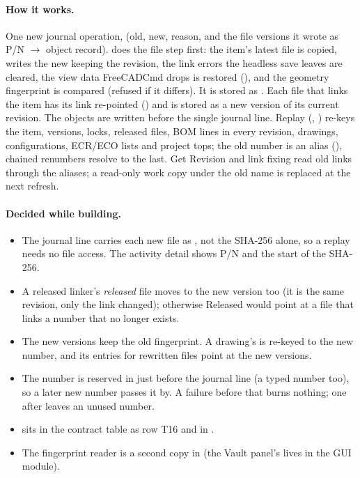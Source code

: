 \paragraph{How it works.} One new journal operation,  (old, new, reason, and the file versions it
wrote as P/N $\to$ object record).  does the file step first: the item's latest file is
copied,  writes the new  keeping the revision, the link errors the
headless save leaves are cleared, the view data FreeCADCmd drops is restored
(), and the geometry fingerprint is compared (refused if it differs).
It is stored as . Each file that links the item has its link re-pointed
() and is stored as a new version of its current revision. The objects are written before the
single journal line. Replay (, ) re-keys the item, versions, locks,
released files, BOM lines in every revision, drawings, configurations, ECR/ECO lists and project tops; the old
number is an alias (), chained renumbers resolve to the last. Get Revision and link fixing read
old links through the aliases; a read-only work copy under the old name is replaced at the next refresh.

\paragraph{Decided while building.}
\begin{itemize}[nosep]
  \item The journal line carries each new file as , not the SHA-256 alone, so a
        replay needs no file access. The activity detail shows P/N and the start of the SHA-256.
  \item A released linker's \emph{released} file moves to the new version too (it is the same revision, only the
        link changed); otherwise Released would point at a file that links a number that no longer exists.
  \item The new versions keep the old fingerprint. A drawing's  is re-keyed to the new number, and
        its entries for rewritten files point at the new versions.
  \item The number is reserved in  just before the journal line (a typed number too), so a
        later new number passes it by. A failure before that burns nothing; one after leaves an unused number.
  \item {} sits in the contract table as row T16 and in .
  \item The fingerprint reader is a second copy in  (the Vault panel's lives in the GUI module).
\end{itemize}

